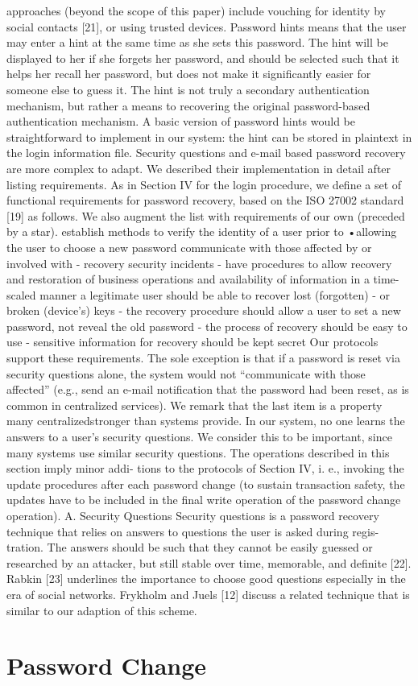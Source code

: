 approaches (beyond the scope of this paper) include vouching
for identity by social contacts [21], or using trusted devices.
 Password hints means that the user may enter a hint at
the same time as she sets this password. The hint will be
displayed to her if she forgets her password, and should be
selected such that it helps her recall her password, but does
not make it significantly easier for someone else to guess it.
The hint is not truly a secondary authentication mechanism,
but rather a means to recovering the original password-based
authentication mechanism. A basic version of password hints
would be straightforward to implement in our system: the
hint can be stored in plaintext in the login information file.
Security questions and e-mail based password recovery are
more complex to adapt. We described their implementation in
detail after listing requirements.
 As in Section IV for the login procedure, we define a set of
functional requirements for password recovery, based on the
ISO 27002 standard [19] as follows. We also augment the list
with requirements of our own (preceded by a star).
establish methods to verify the identity of a user prior to
•allowing the user to choose a new password
communicate with those affected by or involved with
 - recovery security incidents
 - have procedures to allow recovery and restoration of
business operations and availability of information in a
 time-scaled manner
a legitimate user should be able to recover lost (forgotten)
 - or broken (device’s) keys
 - the recovery procedure should allow a user to set a new
 password, not reveal the old password
 - the process of recovery should be easy to use
 - sensitive information for recovery should be kept secret
Our protocols support these requirements. The sole exception
is that if a password is reset via security questions alone, the
system would not “communicate with those affected” (e.g.,
send an e-mail notification that the password had been reset,
as is common in centralized services). We remark that the
last item is a property many centralizedstronger than systems
provide. In our system, no one learns the answers to a user’s
security questions. We consider this to be important, since
many systems use similar security questions.
 The operations described in this section imply minor addi-
tions to the protocols of Section IV, i. e., invoking the update
procedures after each password change (to sustain transaction
safety, the updates have to be included in the final write
operation of the password change operation).
A. Security Questions
 Security questions is a password recovery technique that
relies on answers to questions the user is asked during regis-
tration. The answers should be such that they cannot be easily
guessed or researched by an attacker, but still stable over
time, memorable, and definite [22]. Rabkin [23] underlines
the importance to choose good questions especially in the era
of social networks. Frykholm and Juels [12] discuss a related
technique that is similar to our adaption of this scheme.


 

\section{Password Change}

